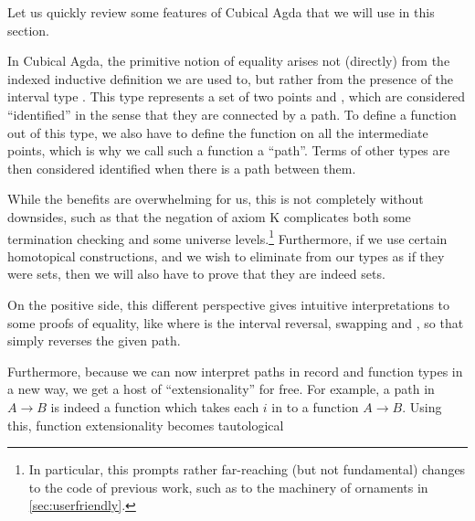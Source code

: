Let us quickly review some features of Cubical Agda \cite{cuagda} that we will use in this section.

In Cubical Agda, the primitive notion of equality arises not (directly) from the indexed inductive definition we are used to, but rather from the presence of the interval type . This type represents a set of two points  and , which are considered ``identified'' in the sense that they are connected by a path. To define a function out of this type, we also have to define the function on all the intermediate points, which is why we call such a function a ``path''. Terms of other types are then considered identified when there is a path between them.

While the benefits are overwhelming for us, this is not completely without downsides, such as that
the negation of axiom K complicates both some termination checking and some universe levels.\footnote{In particular, this prompts rather far-reaching (but not fundamental) changes to the code of previous work, such as to the machinery of ornaments \cite{progorn} in \autoref{sec:userfriendly}.} Furthermore, if we use certain homotopical constructions, and we wish to eliminate from our types as if they were sets, then we will also have to prove that they are indeed sets.

On the positive side, this different perspective gives intuitive interpretations to some proofs of equality, like
where  is the interval reversal, swapping  and , so that  simply reverses the given path.

Furthermore, because we can now interpret paths in record and function types in a new way, we get a host of ``extensionality'' for free. For example, a path in $A \to B$ is indeed a function which takes each $i$ in  to a function $A \to B$. Using this, function extensionality becomes tautological 


